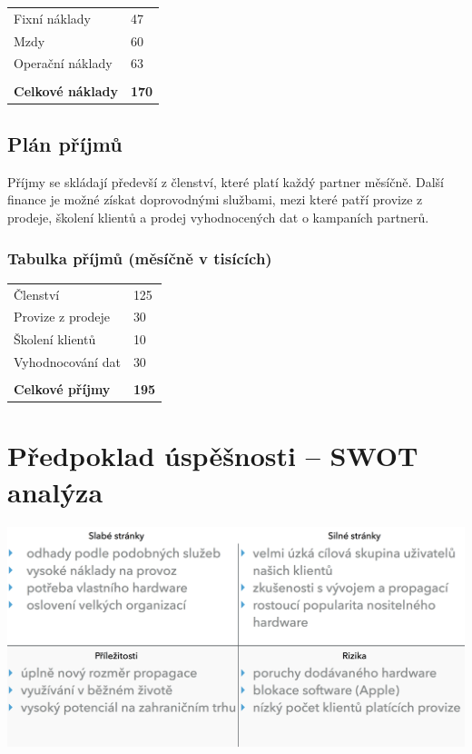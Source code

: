 \documentclass[12pt,czech]{article}
\begin{document}
\bigskip
\begin{center}
\begin{tabular}{ p{6cm} p{4cm} }
  Fixní náklady & \hfill 47 \\
  Mzdy & \hfill 60 \\
  Operační náklady & \hfill 63 \\ \hline
  & \\
  \textbf{Celkové náklady} & \hfill \textbf{170} \\
\end{tabular}
\end{center}

\bigskip
\subsection{Plán příjmů}

Příjmy se skládají předevší z členství, které platí každý partner měsíčně.
Další finance je možné získat doprovodnými službami, mezi které patří provize z prodeje, školení klientů a prodej vyhodnocených dat o kampaních partnerů.

\subsubsection{Tabulka příjmů (měsíčně v tisících)}

\bigskip
\begin{center}
\begin{tabular}{ p{6cm} p{4cm} }
  Členství & \hfill 125 \\
  Provize z prodeje & \hfill 30 \\
  Školení klientů & \hfill 10 \\
  Vyhodnocování dat & \hfill 30 \\ \hline
  & \\
  \textbf{Celkové příjmy} & \hfill \textbf{195}\\
\end{tabular}
\end{center}

\newpage
\section{Předpoklad úspěšnosti -- SWOT analýza}

\vspace{2cm}
\includegraphics[width=\textwidth]{BI-EMP/project-plan/assets/swot}
\end{document}
